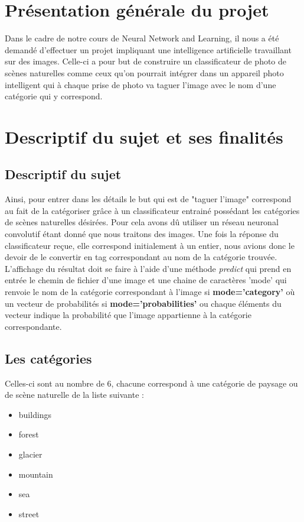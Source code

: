 \documentclass[12pt ,a4paper ]{article}
\begin{document}
\begin{multicols}{2} 
\section{Présentation générale du projet}
		Dans le cadre de notre cours de Neural Network and Learning, il nous a été demandé d'effectuer un projet impliquant une intelligence artificielle travaillant sur des images. Celle-ci a pour but de construire un classificateur de photo de scènes naturelles comme ceux qu’on pourrait intégrer dans un appareil photo intelligent qui à chaque prise de photo va taguer l’image avec le nom d’une catégorie qui y correspond. 
	
		
\section{Descriptif du sujet et ses finalités}
\subsection{Descriptif du sujet}
	Ainsi, pour entrer dans les détails le but qui est de "taguer l'image" correspond au fait de la catégoriser grâce à un classificateur entrainé possédant les catégories de scènes naturelles désirées. Pour cela avons dû utiliser un réseau neuronal convolutif étant donné que nous traitons des images. Une fois la réponse du classificateur reçue, elle correspond initialement à un entier, nous avions donc le devoir de le convertir en tag correspondant au nom de la catégorie trouvée. \\
	
	
	L'affichage du résultat doit se faire à l'aide d'une méthode \textit{predict} qui prend en entrée le chemin de fichier d’une image et une chaine de caractères 'mode' qui renvoie le nom de la catégorie correspondant à l'image si \textbf{mode='category'} où un vecteur de probabilités si \textbf{mode='probabilities'} ou chaque éléments du vecteur indique la probabilité que l'image appartienne à la catégorie correspondante.

\subsection{Les catégories}
Celles-ci sont au nombre de 6, chacune correspond à une catégorie de paysage ou de scène naturelle de la liste suivante : 

\bigskip
\begin{itemize}
\item buildings
\item forest
\item glacier
\item mountain
\item sea
\item street
\end{itemize}


\end{multicols}
\end{document}
